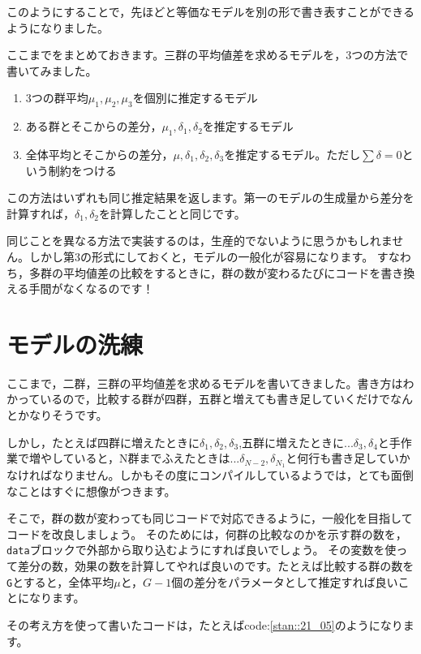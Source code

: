 \documentclass{ltjsbook}
\begin{document}
このようにすることで，先ほどと等価なモデルを別の形で書き表すことができるようになりました。

ここまでをまとめておきます。三群の平均値差を求めるモデルを，3つの方法で書いてみました。
\begin{enumerate}
	\item 3つの群平均$\mu_1,\mu_2,\mu_3$を個別に推定するモデル
	\item ある群とそこからの差分，$\mu_1,\delta_1,\delta_2$を推定するモデル
	\item 全体平均とそこからの差分，$\mu,\delta_1,\delta_2,\delta_3$を推定するモデル。ただし$\sum \delta = 0$という制約をつける
\end{enumerate}
この方法はいずれも同じ推定結果を返します。第一のモデルの生成量から差分を計算すれば，$\delta_1,\delta_2$を計算したことと同じです。

同じことを異なる方法で実装するのは，生産的でないように思うかもしれません。しかし第3の形式にしておくと，モデルの一般化が容易になります。
すなわち，多群の平均値差の比較をするときに，群の数が変わるたびにコードを書き換える手間がなくなるのです！
\section{モデルの洗練}
ここまで，二群，三群の平均値差を求めるモデルを書いてきました。書き方はわかっているので，比較する群が四群，五群と増えても書き足していくだけでなんとかなりそうです。

しかし，たとえば四群に増えたときに$\delta_1,\delta_2,\delta_3$,五群に増えたときに$...\delta_3,\delta_4$と手作業で増やしていると，N群までふえたときは$...\delta_{N-2},\delta_{N_1}$と何行も書き足していかなければなりません。しかもその度にコンパイルしているようでは，とても面倒なことはすぐに想像がつきます。

そこで，群の数が変わっても同じコードで対応できるように，一般化を目指してコードを改良しましょう。
そのためには，何群の比較なのかを示す群の数を，\verb|data|ブロックで外部から取り込むようにすれば良いでしょう。
その変数を使って差分の数，効果の数を計算してやれば良いのです。たとえば比較する群の数を\verb|G|とすると，全体平均$\mu$と，$G-1$個の差分をパラメータとして推定すれば良いことになります。

その考え方を使って書いたコードは，たとえばcode:\ref{stan::21_05}のようになります。
\end{document}
